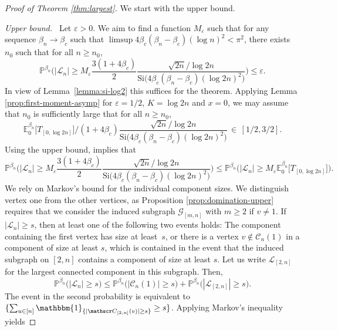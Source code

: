 \documentclass[a4paper, a4wide, 10pt, reqno]{amsart}
\theoremstyle{plain}
\theoremstyle{definition}
\numberwithin{equation}{section}
\newcommand{\E}{\mathbb E}
\newcommand{\Prob}{\mathbb{P}}
\newcommand{\sC}{{\mathscr C}}
\newcommand{\sG}{{\mathscr G}}
\newcommand{\sL}{{\mathscr L}}
\newcommand{\Si}{{\mathrm{Si}}}
\newcommand{\ind}[1]{\mathbbm{1}_{\{#1\}}}
\begin{document}
\begin{proof}[Proof of Theorem \ref{thm:largest}]
We start with the upper bound. 

\medskip\noindent\emph{Upper bound.\ } \label{pr:largest-upper}
Let $\varepsilon>0$. We aim to find a function $M_\varepsilon$ such that for any sequence $\beta_n\to\beta_c$ such that $\limsup 4\beta_c(\beta_n-\beta_c)(\log n)^2<\pi^2$, there exists $n_0$ such that for all $n\ge n_0$, 
\begin{equation}\nonumber
\Prob^{\beta_n}\bigg(|\sL_n| \ge M_\varepsilon \frac{3(1+4\beta_c)}2\frac{\sqrt{2n}/\log 2n}{\Si\big(4\beta_c(\beta_n-\beta_c)(\log 2n)^2\big)}\bigg) \le \varepsilon.
\end{equation}
In view of Lemma~\ref{lemma:si-log2} this suffices for the theorem.
Applying Lemma \ref{prop:first-moment-asymp} for $\varepsilon=1/2$, $K=\log 2n$ and $x=0$, we may assume that $n_0$ is sufficiently large that for all $n\ge n_0$, 
\begin{equation}\label{eq:upper-pr-exp}
\E_0^{\beta_n}\big[T_{[0, \log 2n]}]\Big/ (1+4\beta_c)\frac{\sqrt{2n}/\log 2n}{\Si\big(4\beta_c(\beta_n-\beta_c)(\log 2n)^2\big)} \,\in\,  [1/2, 3/2]. 
\end{equation}
Using the upper bound, implies that 
\begin{equation}\label{eq:upper-largest-pr1}
\Prob^{\beta_n}\bigg(|\sL_n| \ge M_\varepsilon \frac{3(1+4\beta_c)}2\frac{\sqrt{2n}/\log 2n}{\Si\big(4\beta_c(\beta_n-\beta_c)(\log 2n)^2\big)}\bigg)\le \Prob^{\beta_n}\Big(|\sL_n| \ge M_\varepsilon \E_0^{\beta_n}\big[T_{[0, \log 2n]}]\Big).
\end{equation}
We rely on Markov's bound for the individual component sizes. We distinguish vertex one from the other vertices, as Proposition \ref{prop:domination-upper} requires that we consider the induced subgraph $\sG_{[m,n]}$ with $m\ge 2$ if $v\neq 1$. 
    If $|\sL_{n}|\ge s$, then at least one of the following two events holds: The component containing the first vertex has size at least~$s$, or there is a vertex $v\notin\sC_n(1)$ in a component of size at least $s$, which is contained in the event that the induced subgraph on $[2,n]$ contains a component of size at least $s$. Let us write $\sL_{[2,n]}$ for the largest connected component in this subgraph. Then, 
    \[
    \Prob^{\beta_n}\big(|\sL_{n}|\ge s\big) \le \Prob^{\beta_n}\big(|\sC_{n}(1)|\ge s\big) + \Prob^{\beta_n}\big(|\sL_{[2,n]}|\ge s\big).
    \]
    The event in the second probability is equivalent to $\{\sum_{u\in[n]}\ind{|\sC_{[2,n]}(v)| \ge s} \ge s\}$. Applying Markov's inequality yields  

\end{proof}
\end{document}

